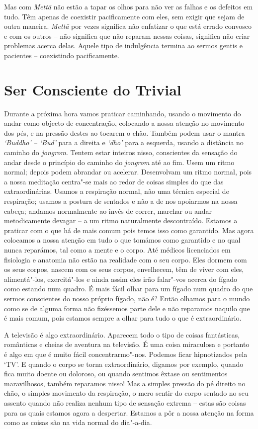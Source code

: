 Mas com \emph{Mettā} não estão a tapar os olhos para não ver as falhas e 
os defeitos em tudo. Têm apenas de coexistir pacificamente com eles, sem
exigir que sejam de outra maneira. \emph{Mettā} por vezes significa não
enfatizar o que está errado convosco e com os outros -- não significa que
não reparam nessas coisas, significa não criar problemas acerca delas.
Aquele tipo de indulgência termina ao sermos gentis e pacientes -- coexistindo
pacificamente.

\chapter{Ser Consciente do Trivial}

Durante a próxima hora vamos praticar caminhando, usando o movimento do
andar como objecto de concentração, colocando a nossa atenção no
movimento dos pés, e na pressão destes ao tocarem o chão. Também podem
usar o mantra \emph{`Buddho' -- `Bud'} para a direita e \emph{`dho'}
para a esquerda, usando a distância no caminho do \emph{jongrom}. Tentem
estar inteiros nisso, conscientes da sensação do andar desde o princípio
do caminho do \emph{jongrom} até ao fim. Usem um ritmo normal; depois
podem abrandar ou acelerar. Desenvolvam um ritmo normal, pois a nossa
meditação centra"-se mais ao redor de coisas simples do que das
extraordinárias. Usamos a respiração normal, não uma técnica especial de
respiração; usamos a postura de sentados e não a de nos apoiarmos na
nossa cabeça; andamos normalmente ao invés de correr, marchar ou andar
metodicamente devagar -- a um ritmo naturalmente descontraído. Estamos a
praticar com o que há de mais comum pois temos isso como garantido.
Mas agora colocamos a nossa atenção em tudo o que tomámos como
garantido e no qual nunca reparámos, tal como a mente e o corpo. Até
médicos licenciados em fisiologia e anatomia não estão na realidade com
o seu corpo. Eles dormem com os seus corpos, nascem com os seus corpos,
envelhecem, têm de viver com eles, alimentá"-los, exercitá"-los e ainda
assim eles irão falar"-vos acerca do fígado como estando num quadro. É
mais fácil olhar para um fígado num quadro do que sermos conscientes do
nosso próprio fígado, não é? Então olhamos para o mundo como se de
alguma forma não fizéssemos parte dele e não reparamos naquilo que é
mais comum, pois estamos sempre a olhar para tudo o que é extraordinário.

A televisão é algo extraordinário. Aparecem todo o tipo de coisas
fantásticas, românticas e cheias de aventura na televisão. É uma coisa
miraculosa e portanto é algo em que é muito fácil concentrarmo"-nos.
Podemos ficar hipnotizados pela `TV'. E quando o corpo se torna
extraordinário, digamos por exemplo, quando fica muito doente ou
doloroso, ou quando sentimos êxtase ou sentimentos maravilhosos, também
reparamos nisso! Mas a simples pressão do pé direito no chão, o simples
movimento da respiração, o mero sentir do corpo sentado no seu assento
quando não realiza nenhum tipo de sensação extrema -- estas são coisas
para as quais estamos agora a despertar. Estamos a pôr a nossa atenção na
forma como as coisas são na vida normal do dia"-a-dia.

